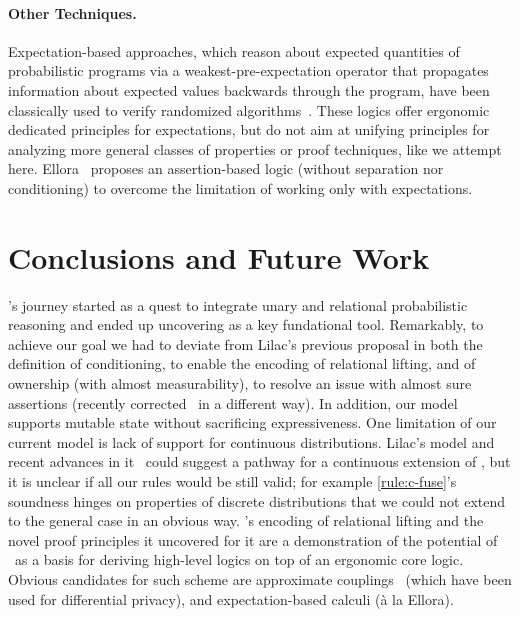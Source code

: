 \documentclass[acmsmall,nonacm,screen,appendix]{acmart}
\begin{document}
\paragraph{\bfseries Other Techniques.}
Expectation-based approaches, which reason about expected quantities of probabilistic programs via a weakest-pre-expectation operator that propagates information about expected values backwards through the program, have been classically used to verify randomized algorithms~\cite{kozen1983PDL,Morgan:1996,kaminski2016weakest,kaminski2019thesis,aguirre2021pre,Bartocci2022moment}.
These logics offer ergonomic dedicated principles for expectations, but do not aim at unifying principles for analyzing more general classes of properties or proof techniques, like we attempt here.
Ellora~\cite{barthe2016ellora} proposes an assertion-based logic (without separation nor conditioning) to overcome the limitation of working only with expectations.


 \section{Conclusions and Future Work}
\thelogic's journey started as a quest to integrate unary and relational
probabilistic reasoning and ended up uncovering \supercond{}
as a key fundational tool.
Remarkably, to achieve our goal we had to deviate from Lilac's previous
proposal in both the definition of conditioning,
  to enable the encoding of relational lifting,
and of ownership (with almost measurability),
  to resolve an issue with almost sure assertions
(recently corrected~\cite{lilac2} in a different way).
In addition, our model supports mutable state without sacrificing
expressiveness.
One limitation of our current model is lack of support for continuous
distributions.
Lilac's model and recent advances in it~\cite{LiAJ0H24} could suggest a pathway for a continuous extension of \thelogic,
but it is unclear if all our rules would be still valid;
for example \cref{rule:c-fuse}'s soundness hinges on properties of discrete distributions that we could not extend to the general case in an obvious way.
\thelogic's encoding of relational lifting and the novel proof principles it uncovered for it are a demonstration of the potential
of \supercond\ as a basis for deriving high-level logics on top of an ergonomic
core logic.
Obvious candidates for such scheme are approximate couplings~\cite{apRHL}
(which have been used for \eg differential privacy),
and expectation-based calculi (à la Ellora).
 
\end{document}
